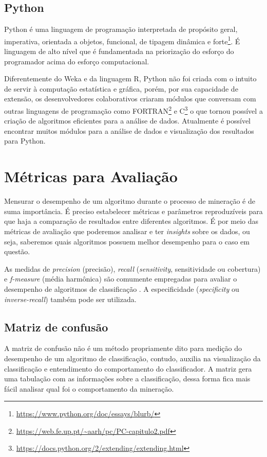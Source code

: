 \subsection{Python}

Python é uma linguagem de programação interpretada de propósito geral, imperativa, orientada a objetos, funcional, de tipagem dinâmica e forte\footnote{\url{https://www.python.org/doc/essays/blurb/}}. É  linguagem de alto nível que é fundamentada na priorização do esforço do programador acima do esforço computacional.

Diferentemente do Weka e da linguagem R, Python não foi criada com o intuito de servir à computação estatística e gráfica, porém, por sua capacidade de extensão, os desenvolvedores colaborativos criaram módulos que conversam com outras linguagens de programação como FORTRAN\footnote{\url{https://web.fe.up.pt/~aarh/pc/PC-capitulo2.pdf}} e C\footnote{\url{https://docs.python.org/2/extending/extending.html}} o que tornou possível a criação de algoritmos eficientes para a análise de dados. Atualmente é possível encontrar muitos módulos para a análise de dados e visualização dos resultados para Python.

\section{Métricas para Avaliação}

Mensurar o desempenho de um algoritmo durante o processo de mineração é de suma importância. É preciso estabelecer métricas e parâmetros reproduzíveis para que haja a comparação de resultados entre diferentes algoritmos. É por meio das métricas de avaliação que poderemos analisar e ter \textit{insights} sobre os dados, ou seja, saberemos quais algoritmos possuem melhor desempenho para o caso em questão.

As medidas de \textit{precision} (precisão), \textit{recall} (\textit{sensitivity}, sensitividade ou cobertura) e \textit{f-measure} (média harmônica) são comumente empregadas para avaliar o desempenho de algoritmos de classificação \cite{Powers2011}. A especificidade  (\textit{specificity} ou  \textit{inverse-recall}) também pode ser utilizada.

\subsection{Matriz de confusão}

A matriz de confusão não é um método propriamente dito para medição do desempenho de um algoritmo de classificação, contudo, auxilia na visualização da classificação \cite{Deng2016} e entendimento do comportamento do classificador. A matriz gera uma tabulação com as informações sobre a classificação, dessa forma fica mais fácil analisar qual foi o comportamento da mineração.

